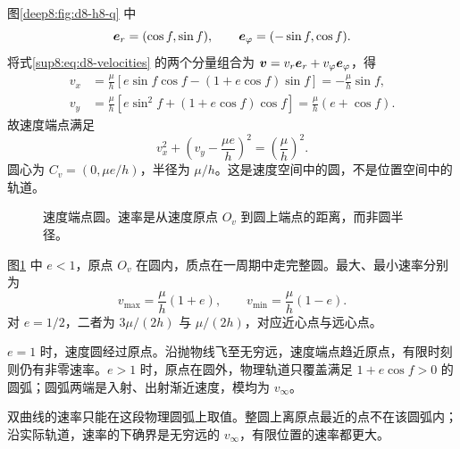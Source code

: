 \begin{solution}
图\ref{deep8:fig:d8-h8-q} 中
\[
 \bm{e}_r=(\cos f,\sin f),\qquad
 \bm{e}_\varphi=(-\sin f,\cos f).
\]
将式\eqref{sup8:eq:d8-velocities} 的两个分量组合为 $\bm{v}=v_r\bm{e}_r+v_\varphi\bm{e}_\varphi$，得
\begin{align*}
 v_x&=\frac\mu h[e\sin f\cos f-(1+e\cos f)\sin f]
     =-\frac\mu h\sin f,\\
 v_y&=\frac\mu h[e\sin^2f+(1+e\cos f)\cos f]
     =\frac\mu h(e+\cos f).
\end{align*}
故速度端点满足
\begin{equation}
 \boxed{v_x^2+\left(v_y-\frac{\mu e}h\right)^2
 =\left(\frac\mu h\right)^2}.
\end{equation}
圆心为 $C_v=(0,\mu e/h)$，半径为 $\mu/h$。这是速度空间中的圆，不是位置空间中的轨道。
\begin{figure}[H]\centering
{}
\caption{速度端点圆。速率是从速度原点 $O_v$ 到圆上端点的距离，而非圆半径。}\label{deep8:fig:d8-h8-s}
\end{figure}
图\ref{deep8:fig:d8-h8-s} 中 $e<1$，原点 $O_v$ 在圆内，质点在一周期中走完整圆。最大、最小速率分别为
\[
 v_{\max}=\frac\mu h(1+e),\qquad
 v_{\min}=\frac\mu h(1-e).
\]
对 $e=1/2$，二者为 $3\mu/(2h)$ 与 $\mu/(2h)$，对应近心点与远心点。

$e=1$ 时，速度圆经过原点。沿抛物线飞至无穷远，速度端点趋近原点，有限时刻则仍有非零速率。$e>1$ 时，原点在圆外，物理轨道只覆盖满足 $1+e\cos f>0$ 的圆弧；圆弧两端是入射、出射渐近速度，模均为 $v_\infty$。

双曲线的速率只能在这段物理圆弧上取值。整圆上离原点最近的点不在该圆弧内；沿实际轨道，速率的下确界是无穷远的 $v_\infty$，有限位置的速率都更大。
\end{solution}



